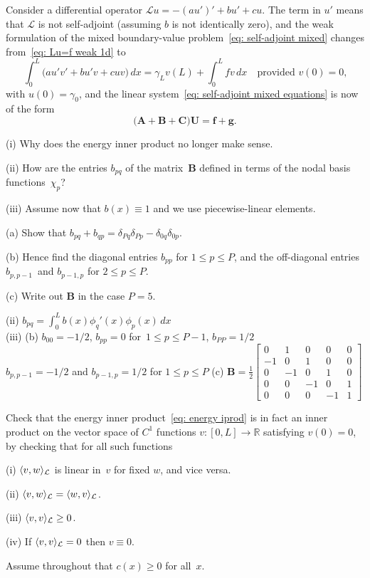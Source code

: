 \begin{Exercises}
\exercise
Consider a differential operator $\mathcal{L}u=-(au')'+bu'+cu$.  The term in 
$u'$ means that $\mathcal{L}$ is not self-adjoint (assuming $b$ is not 
identically zero), and the weak formulation of the mixed boundary-value 
problem~\eqref{eq: self-adjoint mixed} changes from~\eqref{eq: Lu=f weak 1d} to
\[
\int_0^L\bigl(au'v'+bu'v+cuv\bigr)\,dx
    =\gamma_Lv(L)+\int_0^Lfv\,dx\quad\text{provided $v(0)=0$,}
\]
with $u(0)=\gamma_0$, and the linear 
system~\eqref{eq: self-adjoint mixed equations} is now of the form
\[
\bigl(\boldsymbol{A}+\boldsymbol{B}+\boldsymbol{C}\bigr)\boldsymbol{U}
    =\boldsymbol{f}+\boldsymbol{g}.
\]
\begin{description}
\item{(i)} Why does the energy inner product no longer make sense.
\item{(ii)} How are the entries $b_{pq}$ of the matrix~$\boldsymbol{B}$ defined 
in terms of the nodal basis functions~$\chi_p$?
\item{(iii)} Assume now that $b(x)\equiv1$ and we use piecewise-linear elements.
\begin{description}
\item{(a)} Show that 
$b_{pq}+b_{qp}=\delta_{Pq}\delta_{Pp}-\delta_{0q}\delta_{0p}$.
\item{(b)} Hence find the diagonal entries $b_{pp}$ for $1\le p\le P$, and
the off-diagonal entries $b_{p,p-1}$~and $b_{p-1,p}$ for $2\le p\le P$.
\item{(c)} Write out $\boldsymbol{B}$ in the case $P=5$.
\end{description}
\end{description}
\begin{ans}
(ii) $b_{pq}=\int_0^Lb(x)\phi_q'(x)\phi_p(x)\,dx$\\
(iii) (b) $b_{00}=-1/2$, $b_{pp}=0$ for~$1\le p\le P-1$, $b_{PP}=1/2$\\
$b_{p,p-1}=-1/2$ and $b_{p-1,p}=1/2$ for $1\le p\le P$
(c) $\boldsymbol{B}=\frac{1}{2}\begin{bmatrix}
 0& 1& 0& 0&0\\
-1& 0& 1& 0&0\\
 0&-1& 0& 1&0\\
 0& 0&-1& 0&1\\
 0& 0& 0&-1&1\end{bmatrix}$
\end{ans}


\exercise
Check that the energy inner product~\eqref{eq: energy iprod} is in fact an 
inner product on the vector space of $C^1$ functions $v:[0,L]\to\mathbb{R}$ 
satisfying $v(0)=0$, by checking that for all such functions
\begin{description}
\item{(i)} $\langle v,w\rangle_{\mathcal{L}}$ is linear in~$v$ for fixed $w$, and
vice versa.
\item{(ii)} $\langle v,w\rangle_{\mathcal{L}}=\langle w,v\rangle_{\mathcal{L}}$.
\item{(iii)} $\langle v,v\rangle_{\mathcal{L}}\ge0$.
\item{(iv)} If $\langle v,v\rangle_{\mathcal{L}}=0$ then $v\equiv0$.
\end{description}
Assume throughout that $c(x)\ge0$ for all~$x$.


\end{Exercises}
